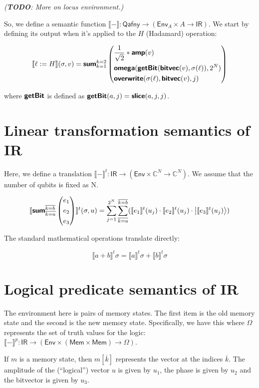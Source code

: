 \documentclass[runningheads]{llncs}
\newcommand {\ra} {\rightarrow}
\newcommand {\Env} {\textsf{Env}}
\newcommand {\sem} [1] {\llbracket #1 \rrbracket}
\newcommand {\Psem} [1] {\sem{#1}^p}
\newcommand {\Tsem} [1] {\sem{#1}^t}
\newcommand {\Mem} {\textsf{Mem}}
\newcommand {\ket}[1]{\ensuremath{\left|#1\right\rangle}}
\newcommand {\ir} [1] {\textsf{\textbf{#1}}}
\newcommand {\IRep} {\textsf{IR}}
\newcommand {\irSum} {\ir{sum}}
\newcommand {\irOverwrite} {\ir{overwrite}}
\newcommand {\irSlice} {\ir{slice}}
\newcommand {\irGetBit} {\ir{getBit}}
\newcommand {\irAmp} {\ir{amp}}
\newcommand {\irBV} {\ir{bitvec}}
\newcommand {\irOmega} {\ir{omega}}
\newcommand {\truthVals} {\Omega}
\newcommand {\Qafny} {\textsf{Qafny}}
\begin{document}
\textit{(\textbf{TODO}: More on locus environment.)}

So, we define a semantic function $\sem{-} : \Qafny \ra (\Env_A \times A \ra \IRep)$. We start by defining its output when it's applied to the $H$ (Hadamard) operation:

\[
  \sem{\ell := H}(\sigma, v) = \irSum_{k=1}^{k=2}
    \left(\begin{aligned}
      &\frac{1}{\sqrt{2}} * \irAmp(v)\\
      &\irOmega(\irGetBit(\irBV(v), \sigma(\ell)), 2^N)\\
      &\irOverwrite(\sigma(\ell), \irBV(v), j)
      \end{aligned}\right)
\]

where $\irGetBit$ is defined as $\irGetBit(a, j) = \irSlice(a, j, j)$.

\section{Linear transformation semantics of IR}

Here, we define a translation $\Tsem{-} : \IRep \ra (\Env \times \mathbb{C}^N \ra \mathbb{C}^N)$. We assume that the number of qubits is fixed as N.

\[
  \Tsem{\irSum_{\overline{k=a}}^{\overline{k=b}}
    \left(\begin{aligned}
      &e_1\\
      &e_2\\
      &e_3
    \end{aligned}\right)}(\sigma, u)
    =
    \sum_{j=1}^{2^N}\sum_{\overline{k=a}}^{\overline{k=b}} (\Tsem{e_1}(u_j) \cdot \Tsem{e_2}(u_j) \cdot \ket{\Tsem{e_3}(u_j)})
\]

\noindent
The standard mathematical operations translate directly:

\[
  \Tsem{a + b}\sigma = \Tsem{a}\sigma + \Tsem{b}\sigma
\]

\section{Logical predicate semantics of IR}

The environment here is pairs of memory states. The first item is the old memory state and the second is the new memory state. Specifically, we have this where $\truthVals$ represents the set of truth values for the logic: $\Psem{-} : \IRep \ra (\Env \times (\Mem \times \Mem) \ra \truthVals)$.

If $m$ is a memory state, then $m[\overline{k}]$ represents the vector at the indices $\overline{k}$. The amplitude of the (``logical'') vector $u$ is given by $u_1$, the phase is given by $u_2$ and the bitvector is given by $u_3$.
\end{document}
